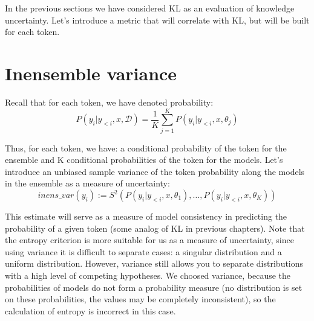 \documentclass[a4paper,14pt]{extarticle}
\begin{document}
	In the previous sections we have considered KL as an evaluation of knowledge uncertainty. Let's introduce a metric that will correlate with KL, but will be built for each token.

\section{Inensemble variance}
	Recall that for each token, we have denoted probability:
	\begin{equation*}
		P(y_i | y_{<i}, x, \mathcal{D}) = \frac1{K} \sum_{j=1}^{K}P(y_i | y_{<i}, x, \theta_j)
	\end{equation*}
	
	Thus, for each token, we have: a conditional probability of the token for the ensemble and K conditional probabilities of the token for the models. Let's introduce an unbiased sample variance of the token probability along the models in the ensemble as a measure of uncertainty:
	\begin{equation}
		inens\_var(y_i) := S^2(P(y_i | y_{<i}, x, \theta_1), \dots, P(y_i | y_{<i}, x, \theta_K))
	\end{equation}
	
	This estimate will serve as a measure of model consistency in predicting the probability of a given token (some analog of KL in previous chapters). Note that the entropy criterion is more suitable for us as a measure of uncertainty, since using variance it is difficult to separate cases: a singular distribution and a uniform distribution. However, variance still allows you to separate distributions with a high level of competing hypotheses. We choosed variance, because the probabilities of models do not form a probability measure (no distribution is set on these probabilities, the values may be completely inconsistent), so the calculation of entropy is incorrect in this case.
	
\end{document}
